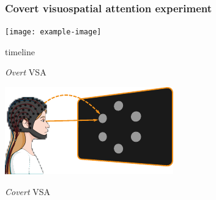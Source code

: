 \documentclass{kul-ulille-beamer}
\begin{document}


\begin{frame}
  \frametitle{Covert visuospatial attention experiment}

  \begin{minipage}{.6\textwidth}
    \centering

    \begin{minipage}[t]{.45\textwidth}
    
    \end{minipage}\hfill%
    \begin{minipage}[t]{.45\textwidth}
      \texttt{[image: example-image]}

      timeline
    \end{minipage}
    \bigskip
    \bigskip
    \bigskip


    {\small
    \begin{minipage}{.3\textwidth}
      \emph{Overt} VSA
      \smallskip

      \includegraphics[width=\textwidth]{figures/covert/attention_overt.pdf}
    \end{minipage}\hfill%
    \begin{minipage}{.3\textwidth}
      \emph{Covert} VSA
      \smallskip


\end{minipage}}
\end{minipage}
\end{frame}
\end{document}
